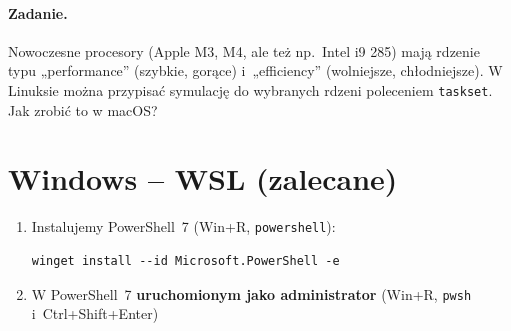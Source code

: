 \documentclass[11pt,a4paper]{article}
\begin{document}
\paragraph{Zadanie.} Nowoczesne procesory (Apple M3, M4, ale też np.~Intel i9 285) mają rdzenie typu
„performance” (szybkie, gorące) i~„efficiency” (wolniejsze, chłodniejsze). W Linuksie można
przypisać symulację do wybranych rdzeni poleceniem \texttt{taskset}. Jak zrobić to w macOS?

\section{Windows -- WSL (zalecane)}\label{sec:wsl}



\begin{enumerate}
\item Instalujemy PowerShell~7 (Win+R, \texttt{powershell}):
\begin{verbatim}
winget install --id Microsoft.PowerShell -e
\end{verbatim}
\item W PowerShell~7 \textbf{uruchomionym jako administrator} (Win+R, \texttt{pwsh} i~Ctrl+Shift+Enter)
 

\end{enumerate}
\end{document}
